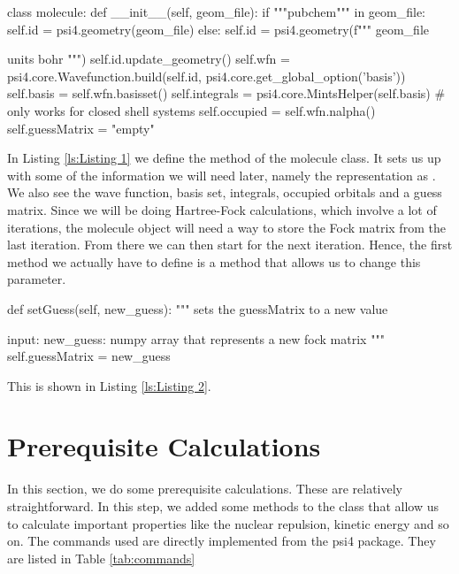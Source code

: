 \begin{python}[caption={intitialising the molecule object},label={ls:Listing 1}]
    class molecule:
        def __init__(self, geom_file):
            if """pubchem""" in geom_file:
                self.id = psi4.geometry(geom_file)
            else:
                self.id = psi4.geometry(f"""
                {geom_file}
            
                units bohr
                """)
            self.id.update_geometry()
            self.wfn =  psi4.core.Wavefunction.build(self.id, 
                            psi4.core.get_global_option('basis'))
            self.basis = self.wfn.basisset()
            self.integrals = psi4.core.MintsHelper(self.basis)
            # only works for closed shell systems
            self.occupied = self.wfn.nalpha()  
            self.guessMatrix = "empty"
    
\end{python}
  

In Listing \ref{ls:Listing 1} we define the  method of the 
molecule class. It sets us up with some of the information we will need later, 
namely the  representation as 
. We also see the wave function, basis set, 
integrals, occupied orbitals and a guess matrix. 
Since we will be doing Hartree-Fock calculations, which involve a 
lot of iterations, the molecule object will need a way to store the Fock 
matrix from the last iteration. From there we can then start for the next 
iteration. Hence, the first method we actually have to define is a method that 
allows us to change this parameter.


\begin{python}[caption={setting the guessMatrix},label={ls:Listing 2}]
    def setGuess(self, new_guess):
        """
        sets the guessMatrix to a new value

        input:
        new_guess: numpy array that represents a new fock matrix
        """
        self.guessMatrix = new_guess
\end{python}

This is shown in Listing \ref{ls:Listing 2}. 

\section{Prerequisite Calculations}
\label{sec:step2}

In this section, we do some prerequisite calculations. These are relatively 
straightforward. In this step, we added some methods to the class that allow us to 
calculate important properties like the nuclear repulsion, kinetic energy and so 
on. The commands used are directly implemented from the psi4 package. 
They are listed in Table \ref{tab:commands}

